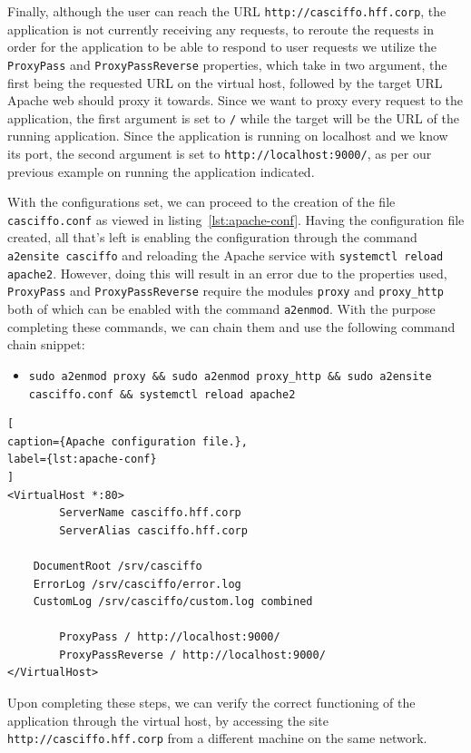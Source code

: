 Finally, although the user can reach the URL \lstinline{http://casciffo.hff.corp}, the application is not currently receiving any requests, to reroute the requests in order for the application to be able to respond to user requests we utilize the \lstinline{ProxyPass} and \lstinline{ProxyPassReverse} properties, which take in two argument, the first being the requested URL on the virtual host, followed by the target URL Apache web should proxy it towards. Since we want to proxy every request to the application, the first argument is set to \lstinline{/} while the target will be the URL of the running application.
Since the application is running on localhost and we know its port, the second argument is set to \lstinline{http://localhost:9000/}, as per our previous example on running the application indicated.

With the configurations set, we can proceed to the creation of the file \lstinline{casciffo.conf} as viewed in listing~\ref{lst:apache-conf}.
Having the configuration file created, all that's left is enabling the configuration through the command \lstinline{a2ensite casciffo} and reloading the Apache service with \lstinline{systemctl reload apache2}. However, doing this will result in an error due to the properties used, \lstinline{ProxyPass} and \lstinline{ProxyPassReverse} require the modules \lstinline{proxy} and \lstinline{proxy_http} both of which can be enabled with the command \lstinline{a2enmod}. With the purpose completing these commands, we can chain them and use the following command chain snippet:

\begin{itemize}
    \item \lstinline{sudo a2enmod proxy && sudo a2enmod proxy_http && sudo a2ensite casciffo.conf && systemctl reload apache2}
\end{itemize}


\begin{lstlisting}[
caption={Apache configuration file.},
label={lst:apache-conf}
]
<VirtualHost *:80>
        ServerName casciffo.hff.corp
        ServerAlias casciffo.hff.corp

	DocumentRoot /srv/casciffo
	ErrorLog /srv/casciffo/error.log
	CustomLog /srv/casciffo/custom.log combined

        ProxyPass / http://localhost:9000/
        ProxyPassReverse / http://localhost:9000/
</VirtualHost>
\end{lstlisting}

Upon completing these steps, we can verify the correct functioning of the application through the virtual host, by accessing the site \lstinline{http://casciffo.hff.corp} from a different machine on the same network.